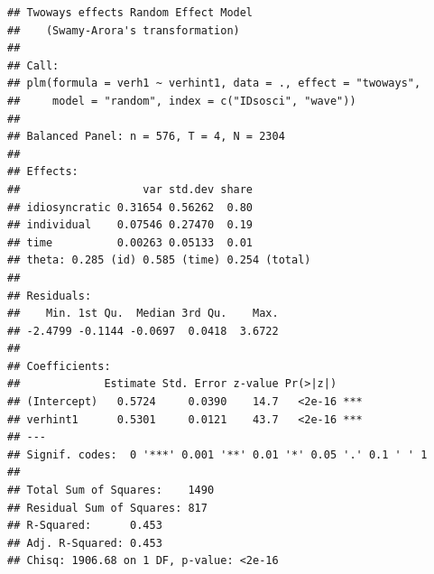 \documentclass[
]{book}
\newenvironment{Shaded}{\begin{snugshade}}{\end{snugshade}}
\newcommand{\CommentTok}[1]{\textcolor[rgb]{0.56,0.35,0.01}{\textit{#1}}}
\newcommand{\DataTypeTok}[1]{\textcolor[rgb]{0.13,0.29,0.53}{#1}}
\newcommand{\KeywordTok}[1]{\textcolor[rgb]{0.13,0.29,0.53}{\textbf{#1}}}
\newcommand{\NormalTok}[1]{#1}
\newcommand{\OperatorTok}[1]{\textcolor[rgb]{0.81,0.36,0.00}{\textbf{#1}}}
\newcommand{\StringTok}[1]{\textcolor[rgb]{0.31,0.60,0.02}{#1}}
\begin{document}
\begin{Shaded}
\end{Shaded}

\begin{verbatim}
## Twoways effects Random Effect Model 
##    (Swamy-Arora's transformation)
## 
## Call:
## plm(formula = verh1 ~ verhint1, data = ., effect = "twoways", 
##     model = "random", index = c("IDsosci", "wave"))
## 
## Balanced Panel: n = 576, T = 4, N = 2304
## 
## Effects:
##                   var std.dev share
## idiosyncratic 0.31654 0.56262  0.80
## individual    0.07546 0.27470  0.19
## time          0.00263 0.05133  0.01
## theta: 0.285 (id) 0.585 (time) 0.254 (total)
## 
## Residuals:
##    Min. 1st Qu.  Median 3rd Qu.    Max. 
## -2.4799 -0.1144 -0.0697  0.0418  3.6722 
## 
## Coefficients:
##             Estimate Std. Error z-value Pr(>|z|)    
## (Intercept)   0.5724     0.0390    14.7   <2e-16 ***
## verhint1      0.5301     0.0121    43.7   <2e-16 ***
## ---
## Signif. codes:  0 '***' 0.001 '**' 0.01 '*' 0.05 '.' 0.1 ' ' 1
## 
## Total Sum of Squares:    1490
## Residual Sum of Squares: 817
## R-Squared:      0.453
## Adj. R-Squared: 0.453
## Chisq: 1906.68 on 1 DF, p-value: <2e-16
\end{verbatim}

\begin{Shaded}
\end{Shaded}
\end{document}

